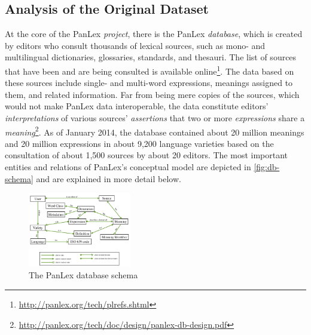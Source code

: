 \documentclass[sw]{iosart2c}
\begin{document}

\subsection{Analysis of the Original Dataset}
\label{sec:analysis}
At the core of the PanLex \emph{project}, there is the PanLex \emph{database}, which is created by editors who consult thousands of lexical sources, such as mono- and multilingual dictionaries, glossaries, standards, and thesauri.
The list of sources that have been and are being consulted is available online\footnote{\url{http://panlex.org/tech/plrefs.shtml}}.
The data based on these sources include single- and multi-word expressions, meanings assigned to them, and related information. Far from being mere copies of the sources, which would not make PanLex data interoperable, the data constitute editors' \emph{interpretations} of various sources' \emph{assertions} that two or more \emph{expressions} share a \emph{meaning}\footnote{\url{http://panlex.org/tech/doc/design/panlex-db-design.pdf}}.
As of January 2014, the database contained about 20 million meanings and 20 million expressions in about 9,200 language varieties based on the consultation of about 1,500 sources by about 20 editors.
The most important entities and relations of PanLex's conceptual model are depicted in \autoref{fig:db-schema} and are explained in more detail below.

\begin{figure}
  \centering
  \includegraphics[width=0.4\textwidth]{images/schema_new.png}
  \caption{The PanLex database schema}
  \label{fig:db-schema}
\end{figure}
\end{document}

